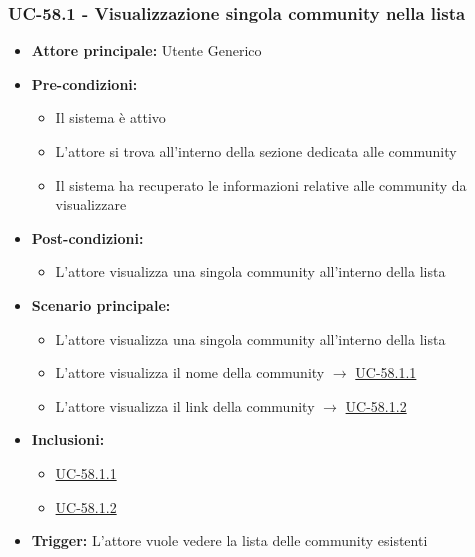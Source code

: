 \documentclass[a4paper,12pt]{article}
\begin{document}
\subsubsection{UC-58.1 - Visualizzazione singola community nella lista} \label{subsec:UC-58.1}
\begin{itemize}
    \item \textbf{Attore principale:} Utente Generico
    \item \textbf{Pre-condizioni:} 
    \begin{itemize}
        \item Il sistema è attivo
        \item L'attore si trova all'interno della sezione dedicata alle community
        \item Il sistema ha recuperato le informazioni relative alle community da visualizzare
    \end{itemize}
    \item \textbf{Post-condizioni:}
    \begin{itemize}
        \item L'attore visualizza una singola community all'interno della lista
    \end{itemize}
    \item \textbf{Scenario principale:} 
    \begin{itemize}
        \item L'attore visualizza una singola community all'interno della lista
        \item L'attore visualizza il nome della community  $\rightarrow$ \hyperref[subsec:UC-58.1.1]{UC-58.1.1}
        \item L'attore visualizza il link della community  $\rightarrow$ \hyperref[subsec:UC-58.1.2]{UC-58.1.2}
    \end{itemize}
    \item \textbf{Inclusioni:} 
    \begin{itemize}
        \item \hyperref[subsec:UC-58.1.1]{UC-58.1.1}
        \item \hyperref[subsec:UC-58.1.2]{UC-58.1.2}
    \end{itemize}
    \item \textbf{Trigger:} L'attore vuole vedere la lista delle community esistenti
\end{itemize}
\end{document}
